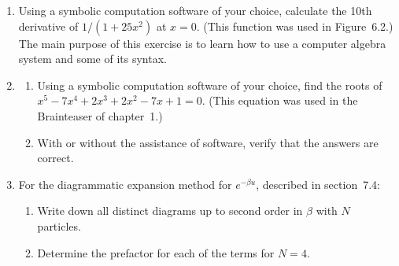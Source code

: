 \documentclass{article}
\begin{document}
\begin{enumerate}
\item 
Using a symbolic computation software of your choice, calculate the 10th derivative of $1/(1+25 x^2)$ at $x=0$. (This function was used in Figure~6.2.)
The main purpose of this exercise is to learn how to use a computer algebra system and some of its syntax.

\item\label{prbl:polysolve}
\begin{enumerate} \setlength{\itemsep}{0pt}
\item Using a symbolic computation software of your choice, find the roots of $x^5 - 7 x^4 + 2 x^3 + 2 x^2 - 7 x + 1 = 0$.
(This equation was used in the Brainteaser of chapter~1.)
\item With or without the assistance of software, verify that the answers are correct.
\end{enumerate}

\item For the diagrammatic expansion method for $e^{-\beta u}$, described in section~7.4: \label{prbl:feynman}
\vspace{-1em}
\begin{enumerate} \setlength{\itemsep}{0pt}
\item Write down all distinct diagrams up to second order in $\beta$ with $N$ particles. 
\item Determine the prefactor for each of the terms for $N=4$.
\end{enumerate}
 
\end{enumerate}










\newpage
\end{document}
